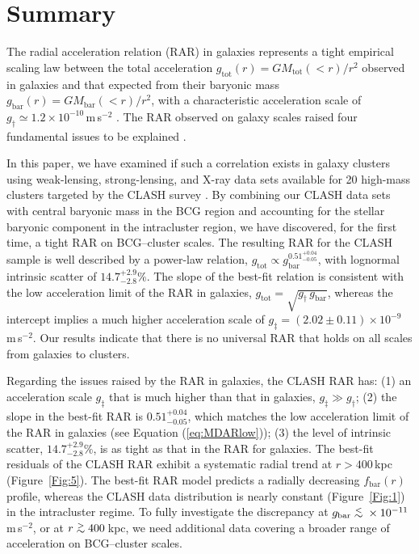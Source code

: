 \documentclass[a4paper,iop,twocolumn,twocolappendix,numberedappendix,appendixfloats]{emulateapj}
\newcommand{\percent}{\ensuremath{\%}}
\newcommand{\simgt}{\lower.5ex\hbox{$\; \buildrel > \over \sim \;$}}
\newcommand{\simlt}{\lower.5ex\hbox{$\; \buildrel < \over \sim \;$}}
\newcommand{\Mtot}{M_\mathrm{tot}}
\newcommand{\Mbar}{M_\mathrm{bar}}
\newcommand{\gbar}{g_\mathrm{bar}}
\newcommand{\gtot}{g_\mathrm{tot}}
\newcommand{\fbar}{f_\mathrm{bar}}
\begin{document}
\section{Summary}
\label{sec:summary}

The radial acceleration relation (RAR) in galaxies represents a tight
 empirical scaling law between the total acceleration
 $\gtot(r)=G\Mtot(<r)/r^2$
 observed in galaxies and that expected from their baryonic mass
 $\gbar(r)=G\Mbar(<r)/r^2$,
 with a characteristic acceleration scale of
 $g_\dag\simeq 1.2\times 10^{-10}$\,m\,s$^{-2}$ \citep{McGaugh16}.
The RAR observed on galaxy scales raised four fundamental issues
 to be explained \citep[see Section~\ref{sec:intro};][]{Desmond17, Lelli17}.

In this paper, we have examined if such a correlation exists in galaxy
 clusters using weak-lensing, strong-lensing, and X-ray data sets
 \citep{Donahue14,Umetsu16} available for 20
 high-mass clusters targeted by the CLASH survey \citep{Postman12}.
By combining our CLASH data sets with central baryonic mass in the BCG
region and accounting for the stellar baryonic component in the
intracluster region, we have discovered, for the first time, a tight RAR
on BCG--cluster scales.
The resulting RAR for the CLASH sample is well described by a power-law
 relation,
 $\gtot\propto g_\mathrm{bar}^{0.51^{+0.04}_{-0.05}}$, with
 lognormal intrinsic scatter of $14.7^{+2.9}_{-2.8}\percent$.
The slope of the best-fit relation is consistent with the low
acceleration limit of the RAR in galaxies,
$\gtot =\sqrt{g_\dag\, g_\mathrm{bar}}$,
 whereas the intercept implies a much higher acceleration scale
 of $g_\ddag = (2.02\pm0.11)\times 10^{-9}$\,m\,s$^{-2}$.
Our results indicate that there is no universal RAR that holds on all
scales from galaxies to clusters.

Regarding the issues raised by the RAR in galaxies,
the CLASH RAR has:
(1) an acceleration scale $g_\ddag$ that is much higher than that in
galaxies, $g_\ddag \gg g_\dag$;
(2) the slope in the best-fit RAR is $0.51^{+0.04}_{-0.05}$,
which matches the low acceleration limit of the RAR in galaxies (see
Equation (\ref{eq:MDARlow}));
(3) the level of intrinsic scatter, $14.7^{+2.9}_{-2.8}\percent$,
is as tight as that in the RAR for galaxies.
The best-fit residuals of the CLASH RAR exhibit a systematic radial
trend at $r>400$\,kpc (Figure~\ref{Fig:5}).
The best-fit RAR model predicts a radially decreasing $\fbar(r)$
profile, whereas the CLASH data distribution is nearly constant
(Figure~\ref{Fig:1}) in the intracluster regime.
To fully investigate the discrepancy at
$\gbar\simlt \times10^{-11}$\,m\,s$^{-2}$, or at $r\simgt 400$\,kpc,
we need additional data covering a broader range of acceleration on
BCG--cluster scales.
\end{document}
